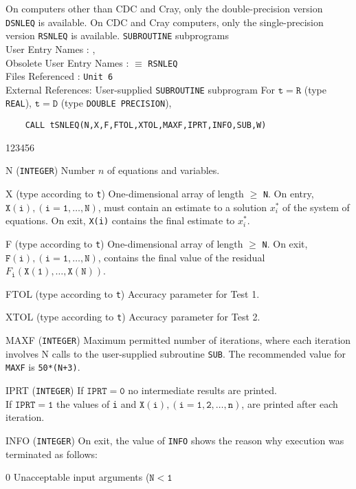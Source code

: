 On computers other than CDC and Cray, only the double-precision version
{\tt DSNLEQ} is available. On CDC and Cray computers,
only the single-precision version {\tt RSNLEQ} is available.
\Structure
{\tt SUBROUTINE} subprograms \\
User Entry Names : , \\
Obsolete User Entry Names :  $\equiv$ {\tt RSNLEQ}\\
Files  Referenced : {\tt Unit 6} \\
External  References: User-supplied {\tt SUBROUTINE} subprogram
\Usage
For $\mathtt{t=R}$ (type {\tt REAL}), $\mathtt{t=D}$ (type
{\tt DOUBLE PRECISION}),
\begin{verbatim}
    CALL tSNLEQ(N,X,F,FTOL,XTOL,MAXF,IPRT,INFO,SUB,W)
\end{verbatim}
\begin{DLtt}{123456}
\item[N] ({\tt INTEGER}) Number $n$ of equations and variables.
\item[X] (type according to {\tt t}) One-dimensional array of length
$\ge $ {\tt N}. On entry, $\mathtt{X(i),(i=1,\ldots,N)}$, must
contain an estimate to a solution $x_i^*$ of the system of equations.
On exit, {\tt X(i)} contains the final estimate to $x_i^*$.
\item[F] (type according to {\tt t}) One-dimensional array of length
$\ge $ {\tt N}. On exit, $\mathtt{F(i),(i=1,\ldots,N)}$, contains the
final value of the residual $F_{\mathtt i}\mathtt{(X(1),\ldots,X(N))}$.
\item[FTOL] (type according to {\tt t}) Accuracy parameter for Test 1.
\item[XTOL] (type according to {\tt t}) Accuracy parameter for Test 2.
\item[MAXF] ({\tt INTEGER}) Maximum permitted number of iterations,
where each iteration involves N calls to the user-supplied
subroutine {\tt SUB}. The recommended value
for {\tt MAXF} is {\tt 50*(N+3)}.
\item[IPRT] ({\tt INTEGER}) If $\mathtt{IPRT=0}$ no intermediate
results are printed. \\
If $\mathtt{IPRT=1}$ the values of {\tt i} and
$\mathtt{X(i),(i=1,2,\ldots,n)}$, are printed after each iteration.
\item[INFO] ({\tt INTEGER}) On exit, the value of {\tt INFO} shows the
reason why execution was terminated as follows:
\begin{DLtt}{12}
\item[0] Unacceptable input arguments ($\mathtt{N < 1}$

\end{DLtt}
\end{DLtt}

